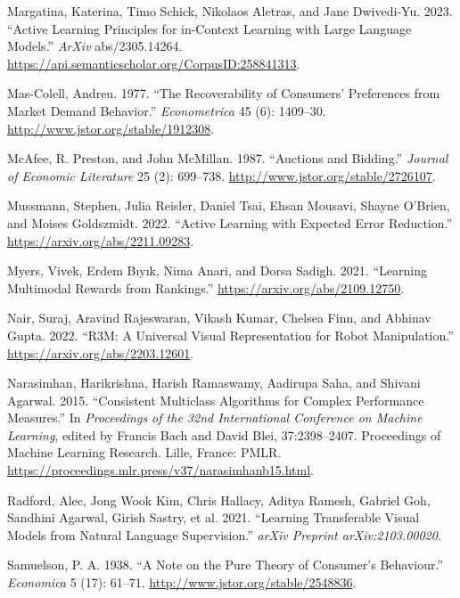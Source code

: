 \documentclass[
  letterpaper,
  numbers=noenddot,
  DIV=11]{scrreprt}
\newlength{\cslhangindent}
\newenvironment{CSLReferences}[2] %
 {\begin{list}{}{%
  \setlength{\itemindent}{0pt}
  \setlength{\leftmargin}{0pt}
  \setlength{\parsep}{0pt}
  \ifodd #1
   \setlength{\leftmargin}{\cslhangindent}
   \setlength{\itemindent}{-1\cslhangindent}
  \fi
  \setlength{\itemsep}{#2\baselineskip}}}
 {\end{list}}
\theoremstyle{definition}
\theoremstyle{plain}
\theoremstyle{plain}
\theoremstyle{remark}
\begin{document}
\begin{CSLReferences}{1}{0}
Margatina, Katerina, Timo Schick, Nikolaos Aletras, and Jane Dwivedi-Yu.
2023. {``Active Learning Principles for in-Context Learning with Large
Language Models.''} \emph{ArXiv} abs/2305.14264.
\url{https://api.semanticscholar.org/CorpusID:258841313}.

Mas-Colell, Andreu. 1977. {``The Recoverability of Consumers'
Preferences from Market Demand Behavior.''} \emph{Econometrica} 45 (6):
1409--30. \url{http://www.jstor.org/stable/1912308}.

McAfee, R. Preston, and John McMillan. 1987. {``Auctions and Bidding.''}
\emph{Journal of Economic Literature} 25 (2): 699--738.
\url{http://www.jstor.org/stable/2726107}.

Mussmann, Stephen, Julia Reisler, Daniel Tsai, Ehsan Mousavi, Shayne
O'Brien, and Moises Goldszmidt. 2022. {``Active Learning with Expected
Error Reduction.''} \url{https://arxiv.org/abs/2211.09283}.

Myers, Vivek, Erdem Bıyık, Nima Anari, and Dorsa Sadigh. 2021.
{``Learning Multimodal Rewards from Rankings.''}
\url{https://arxiv.org/abs/2109.12750}.

Nair, Suraj, Aravind Rajeswaran, Vikash Kumar, Chelsea Finn, and Abhinav
Gupta. 2022. {``R3M: A Universal Visual Representation for Robot
Manipulation.''} \url{https://arxiv.org/abs/2203.12601}.

Narasimhan, Harikrishna, Harish Ramaswamy, Aadirupa Saha, and Shivani
Agarwal. 2015. {``Consistent Multiclass Algorithms for Complex
Performance Measures.''} In \emph{Proceedings of the 32nd International
Conference on Machine Learning}, edited by Francis Bach and David Blei,
37:2398--2407. Proceedings of Machine Learning Research. Lille, France:
PMLR. \url{https://proceedings.mlr.press/v37/narasimhanb15.html}.

Radford, Alec, Jong Wook Kim, Chris Hallacy, Aditya Ramesh, Gabriel Goh,
Sandhini Agarwal, Girish Sastry, et al. 2021. {``Learning Transferable
Visual Models from Natural Language Supervision.''} \emph{arXiv Preprint
arXiv:2103.00020}.

Samuelson, P. A. 1938. {``A Note on the Pure Theory of Consumer's
Behaviour.''} \emph{Economica} 5 (17): 61--71.
\url{http://www.jstor.org/stable/2548836}.


\end{CSLReferences}
\end{document}

